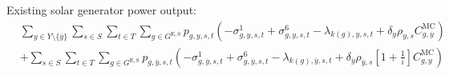 \documentclass{article}
\newcommand{\sGeneratorsExistingSolar}{G^{\mathrm{E,S}}}
\newcommand{\sYears}{Y}
\newcommand{\sScenarios}{S}
\newcommand{\sIntervals}{T}
\newcommand{\iGenerator}{g}
\newcommand{\iYear}{y}
\newcommand{\iYearTerminal}{\overline{\iYear}}
\newcommand{\iScenario}{s}
\newcommand{\iInterval}{t}
\newcommand{\iIntervalTerminal}{\overline{\iInterval}}
\newcommand{\iZone}{z}
\newcommand{\cScenarioDuration}[1][\iYear,\iScenario]{\rho_{#1}}
\newcommand{\cMarginalCost}[1][\iGenerator,\iYear]{C^{\mathrm{MC}}_{#1}}
\newcommand{\cInterestRate}{i}
\newcommand{\cDiscountRate}[1][\iYear]{\delta_{#1}}
\newcommand{\vPower}[1][\iGenerator,\iYear,\iScenario,\iInterval]{p_{#1}}
\newcommand{\dMinPowerOutput}[1][\iGenerator,\iYear,\iScenario,\iInterval]{\sigma_{#1}^{1}}
\newcommand{\dMaxPowerOutputSolarExisting}[1][\iGenerator,\iYear,\iScenario,\iInterval]{\sigma_{#1}^{6}}
\newcommand{\dRampRateUp}[1][\iGenerator,\iYear,\iScenario,\iInterval]{\sigma_{#1}^{20}}
\newcommand{\dRampRateDown}[1][\iGenerator,\iYear,\iScenario,\iInterval]{\sigma_{#1}^{23}}
\newcommand{\dPowerBalance}[1][\iZone,\iYear,\iScenario,\iInterval]{\lambda_{#1}}
\newcommand{\dGeneratorEnergyOutput}[1][\iGenerator,\iYear,\iScenario,\iInterval]{\zeta_{#1}^{2}}
\begin{document}
Existing solar generator power output:
\begin{align}
	& \sum\limits_{\iYear \in \sYears 
		\setminus \{\iYearTerminal\}
	}\sum\limits_{\iScenario \in \sScenarios}\sum\limits_{\iInterval \in \sIntervals} \sum\limits_{\iGenerator \in \sGeneratorsExistingSolar} \vPower\left(-\dMinPowerOutput + \dMaxPowerOutputSolarExisting 
	- \dPowerBalance[k(\iGenerator),\iYear,\iScenario,\iInterval] + \cDiscountRate \cScenarioDuration\cMarginalCost
	\right) \nonumber\\
	& + \sum\limits_{\iScenario \in \sScenarios} \sum\limits_{\iInterval \in \sIntervals} \sum\limits_{\iGenerator \in \sGeneratorsExistingSolar} \vPower[\iGenerator,\iYearTerminal,\iScenario,\iInterval] \left(-\dMinPowerOutput[\iGenerator,\iYearTerminal,\iScenario,\iInterval] + \dMaxPowerOutputSolarExisting[\iGenerator,\iYearTerminal,\iScenario,\iInterval] - \dPowerBalance[k(\iGenerator),\iYearTerminal,\iScenario,\iInterval] + \cDiscountRate[\iYearTerminal] \cScenarioDuration[\iYearTerminal,\iScenario] \left[1 + \frac{1}{\cInterestRate}\right] \cMarginalCost \right)\\
\end{align}
\end{document}
